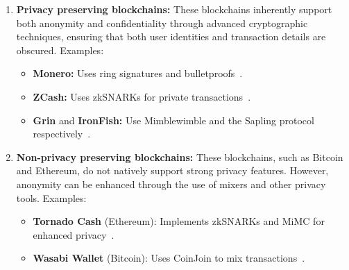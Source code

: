 \documentclass[pdftex,twocolumn,epjc3]{svjour3}
\begin{document}
\begin{sloppypar}
\begin{enumerate}
    \item \textbf{Privacy preserving blockchains:} These blockchains inherently support both anonymity and confidentiality through advanced cryptographic techniques, ensuring that both user identities and transaction details are obscured. Examples:
      \begin{itemize}
          \item \textbf{Monero:} Uses ring signatures and bulletproofs~\cite{vansaberhagenCryptoNote2013, noetherRingSignatureConfidential2015, bunzBulletproofsShortProofs2018}.
          \item \textbf{ZCash:} Uses zkSNARKs for private transactions~\cite{ben-sassonZerocashDecentralizedAnonymous2014}.
          \item \textbf{Grin} and \textbf{IronFish:} Use Mimblewimble and the Sapling protocol respectively~\cite{jedusorMIMBLEWIMBLE2016,fuchsbauerAggregateCashSystems2019, hopwoodZcashSaplingProtocol2022, ironfishPrivateAnonymousEasy}.
    \end{itemize}

    \item \textbf{Non-privacy preserving blockchains:} These blockchains, such as Bitcoin and Ethereum, do not natively support strong privacy features. However, anonymity can be enhanced through the use of mixers and other privacy tools. Examples:
    \begin{itemize}
          \item \textbf{Tornado Cash} (Ethereum): Implements zkSNARKs and MiMC for enhanced privacy~\cite{grothSizePairingbasedNoninteractive2016,pertsevTornadoCashPrivacy2019}.
          \item \textbf{Wasabi Wallet} (Bitcoin): Uses CoinJoin to mix transactions~\cite{maxwellCoinJoinBitcoinPrivacy2013,wasabiwalletBitcoinPrivacyWallet}.
    \end{itemize}
\end{enumerate}
\end{sloppypar}
\end{document}
